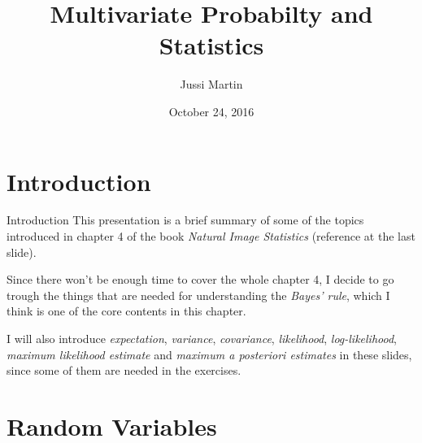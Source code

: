 \documentclass{beamer}
\title[Multivariate Probability and Statistics]{Multivariate Probabilty and Statistics}
\author{Jussi Martin}
\date{October 24, 2016}
\begin{document}
\begin{frame}
  \titlepage
\end{frame}


%
%
%
%
%

\section{Introduction}

\begin{frame}{Introduction}
  This presentation is a brief summary of some of the topics introduced in
  chapter 4 of the book \emph{Natural Image Statistics} (reference at
  the last slide).

  Since there won't be enough time to cover the whole chapter 4, I decide to go
  trough the things that are needed for understanding the \emph{Bayes' rule},
  which I think is one of the core contents in this chapter.

  I will also introduce \emph{expectation}, \emph{variance}, \emph{covariance},
  \emph{likelihood}, \emph{log-likelihood}, \emph{maximum likelihood estimate}
  and \emph{maximum a posteriori estimates} in these slides, since some of them
  are needed in the exercises.
\end{frame}

\section{Random Variables}
\end{document}
